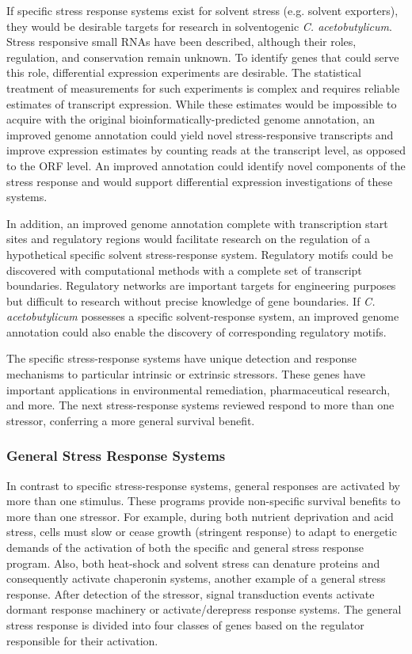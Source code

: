 If specific stress response systems exist for solvent stress (e.g. solvent exporters), they would be desirable targets for research in solventogenic \textit{C. acetobutylicum}. Stress responsive small RNAs have been described,\cite{39} although their roles, regulation, and conservation remain unknown. To identify genes that could serve this role, differential expression experiments are desirable. The statistical treatment of measurements for such experiments is complex and requires reliable estimates of transcript expression.\cite{111,112} While these estimates would be impossible to acquire with the original bioinformatically-predicted genome annotation, an improved genome annotation could yield novel stress-responsive transcripts and improve expression estimates by counting reads at the transcript level, as opposed to the ORF level. An improved annotation could identify novel components of the stress response and would support differential expression investigations of these systems.

In addition, an improved genome annotation complete with transcription start sites and regulatory regions would facilitate research on the regulation of a hypothetical specific solvent stress-response system. Regulatory motifs could be discovered with computational methods\cite{5,35} with a complete set of transcript boundaries.\cite{105,106,107} Regulatory networks are important targets for engineering purposes but difficult to research without precise knowledge of gene boundaries. If \textit{C. acetobutylicum} possesses a specific solvent-response system, an improved genome annotation could also enable the discovery of corresponding regulatory motifs.

The specific stress-response systems have unique detection and response mechanisms to particular intrinsic or extrinsic stressors. These genes have important applications in environmental remediation,\cite{128} pharmaceutical research,\cite{127} and more. The next stress-response systems reviewed respond to more than one stressor, conferring a more general survival benefit.


\subsubsection{General Stress Response Systems}

In contrast to specific stress-response systems, general responses are activated by more than one stimulus. These programs provide non-specific survival benefits to more than one stressor. For example, during both nutrient deprivation and acid stress, cells must slow or cease growth (stringent response) to adapt to energetic demands of the activation of both the specific and general stress response program. Also, both heat-shock and solvent stress can denature proteins and consequently activate chaperonin systems, another example of a general stress response.\cite{74,75,77} After detection of the stressor, signal transduction events activate dormant response machinery or activate/derepress response systems\cite{77,78}. The general stress response is divided into four classes of genes based on the regulator responsible for their activation. 

